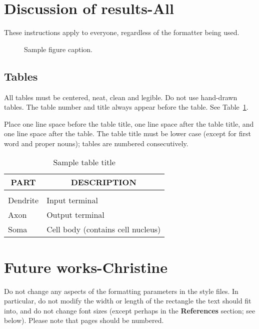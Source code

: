 \documentclass{article} %
\begin{document}
\section{Discussion of results-All}
\label{others}

These instructions apply to everyone, regardless of the formatter being used.

\begin{figure}[h]
\begin{center}
\fbox{\rule[-.5cm]{0cm}{4cm} \rule[-.5cm]{4cm}{0cm}}
\end{center}
\caption{Sample figure caption.}
\end{figure}

\subsection{Tables}

All tables must be centered, neat, clean and legible. Do not use hand-drawn
tables. The table number and title always appear before the table. See
Table~\ref{sample-table}.

Place one line space before the table title, one line space after the table
title, and one line space after the table. The table title must be lower case
(except for first word and proper nouns); tables are numbered consecutively.

\begin{table}[t]
\caption{Sample table title}
\label{sample-table}
\begin{center}
\begin{tabular}{ll}
\multicolumn{1}{c}{\bf PART}  &\multicolumn{1}{c}{\bf DESCRIPTION}
\\ \hline \\
Dendrite         &Input terminal \\
Axon             &Output terminal \\
Soma             &Cell body (contains cell nucleus) \\
\end{tabular}
\end{center}
\end{table}

\section{Future works-Christine}


Do not change any aspects of the formatting parameters in the style files.
In particular, do not modify the width or length of the rectangle the text
should fit into, and do not change font sizes (except perhaps in the
\textbf{References} section; see below). Please note that pages should be
numbered.
\end{document}
